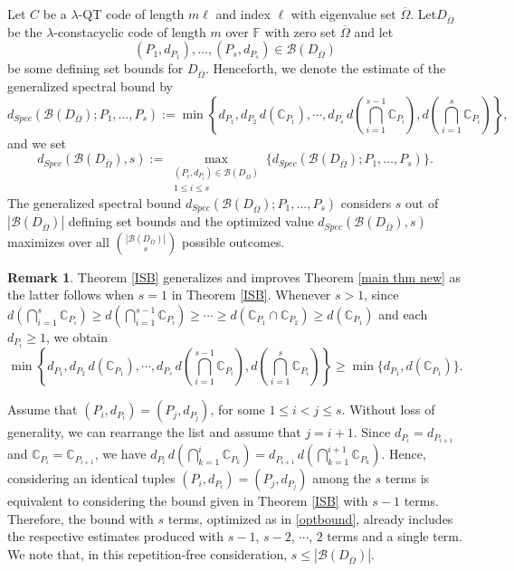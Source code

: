 \documentclass[11pt]{amsart}
\theoremstyle{plain}
\theoremstyle{definition}
\newtheorem{rem}[thm]{Remark}
\numberwithin{equation}{section}
\newcommand{\F}{{\mathbb F}}
\begin{document}
Let $C$ be a $\lambda$-QT code of length $m\ell$ and index $\ell$ with eigenvalue set $\overline{\Omega}$. Let$D_{\overline{\Omega}}$ be the $\lambda$-constacyclic code of length $m$ over $\F$ with zero set $\overline{\Omega}$ and let
\[
(P_1,d_{P_1}),\ldots,(P_s,d_{P_s})\in \mathcal{B}(D_{\overline{\Omega}})
\]
be some defining set bounds for $D_{\overline{\Omega}}$. Henceforth, we denote the estimate of the generalized spectral bound by
\[
d_{Spec}(\mathcal{B}(D_{\overline{\Omega}}); P_1,\ldots,P_s) := \min\left\{d_{P_1}, d_{P_2} \, d(\mathbb{C}_{P_1}), \cdots, d_{P_s} \, d\left(\bigcap_{i=1}^{s-1}\mathbb{C}_{P_i}\right), d\left(\bigcap_{i=1}^s\mathbb{C}_{P_i}\right)\right\},
\]
and we set
\begin{equation}\label{optbound}
d_{Spec}(\mathcal{B}(D_{\overline{\Omega}}),s):=\max_{\substack{(P_i,d_{P_i})\in \mathcal{B}(D_{\overline{\Omega}}) \\ 1\leq i \leq s}} \{d_{Spec}(\mathcal{B}(D_{\overline{\Omega}}); P_1,\ldots,P_s)\}.
\end{equation}
The generalized spectral bound $d_{Spec}(\mathcal{B}(D_{\overline{\Omega}}); P_1,\ldots,P_s)$ considers $s$ out of $|\mathcal{B}(D_{\overline{\Omega}})|$ defining set bounds and the optimized value $d_{Spec}(\mathcal{B}(D_{\overline{\Omega}}),s)$ maximizes over all $ \binom{|\mathcal{B}(D_{\overline{\Omega}})|}{s}$ possible outcomes.


\begin{rem}\label{remark1}
Theorem \ref{ISB} generalizes and improves Theorem \ref{main thm new} as the latter follows when $s=1$ in Theorem \ref{ISB}. Whenever $s>1$, since $d\left(\bigcap_{i=1}^s \mathbb{C}_{P_i}\right) \geq d\left(\bigcap_{i=1}^{s-1} \mathbb{C}_{P_i}\right) \geq \cdots \geq d(\mathbb{C}_{P_1} \cap \mathbb{C}_{P_2}) \geq d(\mathbb{C}_{P_1})$ and each $d_{P_i}\geq 1$, we obtain
\[
\min\left\{d_{P_1}, d_{P_2} \, d(\mathbb{C}_{P_1}),\cdots, d_{P_s} \, d\left(\bigcap_{i=1}^{s-1}\mathbb{C}_{P_i}\right), d \left(\bigcap_{i=1}^s \mathbb{C}_{P_i} \right)\right\}\geq \min\{d_{P_1}, d(\mathbb{C}_{P_1})\}.
\]

Assume that $(P_i,d_{P_i})=(P_j,d_{P_j})$, for some $1\leq i<j\leq s$. Without loss of generality, we can rearrange the list and assume that $j=i+1$. Since $d_{P_i}=d_{P_{i+1}}$ and $\mathbb{C}_{P_i}=\mathbb{C}_{P_{i+1}}$, we have $d_{P_i} \, d\left(\bigcap_{k=1}^{i}\mathbb{C}_{P_k}\right)=d_{P_{i+1}} \, d\left(\bigcap_{k=1}^{i+1}\mathbb{C}_{P_k}\right)$. Hence, considering an identical tuples $(P_i,d_{P_i})=(P_j,d_{P_j})$ among the $s$ terms is equivalent to considering the bound given in Theorem \ref{ISB} with $s-1$ terms. Therefore, the bound with $s$ terms, optimized as in \eqref{optbound}, already includes the respective estimates produced with $s-1$, $s-2$, $\cdots$, $2$ terms and a single term. We note that, in this repetition-free consideration, $s \leq |\mathcal{B}(D_{\overline{\Omega}})|$.
\end{rem}
\end{document}
